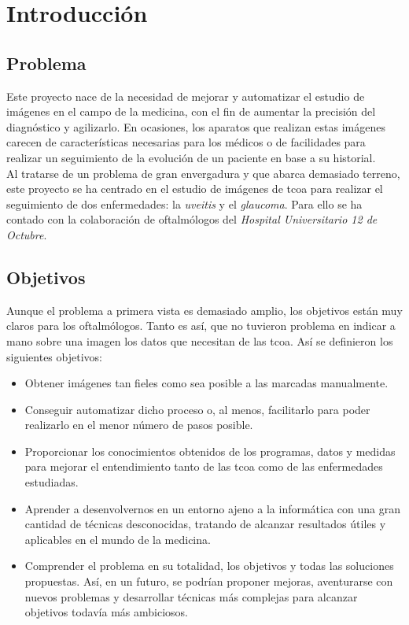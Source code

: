 \chapter{Introducción}
\section{Problema}
Este proyecto nace de la necesidad de mejorar y automatizar el estudio 
de imágenes en el campo de la medicina, con el fin de aumentar la precisión 
del diagnóstico y agilizarlo. En ocasiones, los aparatos que realizan 
estas imágenes carecen de características necesarias para los médicos 
o de facilidades para realizar un seguimiento de la evolución de un paciente 
en base a su historial. \\
Al tratarse de un problema de gran envergadura y que abarca demasiado
terreno, este proyecto se ha centrado en el estudio de imágenes de \gls{tcoa}
para realizar el seguimiento de dos enfermedades: la \emph{uveitis} y
el \emph{glaucoma}. Para ello se ha contado con la colaboración de
oftalmólogos del \emph{Hospital Universitario 12 de Octubre}.

\section{Objetivos}
Aunque el problema a primera vista es demasiado amplio,
los objetivos están muy claros para los oftalmólogos. Tanto es así, 
que no tuvieron problema en indicar a mano sobre una imagen los datos que 
necesitan de las \gls{tcoa}. Así se definieron los siguientes objetivos:
\begin{itemize}
\item Obtener imágenes tan fieles como sea posible a las marcadas
  manualmente.
\item Conseguir automatizar dicho proceso o, al menos,
  facilitarlo para poder realizarlo en el menor número de pasos posible.
\item Proporcionar los conocimientos obtenidos de los programas, datos y
  medidas para mejorar el entendimiento tanto de las \gls{tcoa}
  como de las enfermedades estudiadas.
\item Aprender a desenvolvernos en un entorno ajeno a la informática
  con una gran cantidad de técnicas desconocidas, tratando 
  de alcanzar resultados útiles y aplicables en el mundo de la medicina.
\item Comprender el problema en su totalidad, los objetivos y todas
  las soluciones propuestas. Así, en un futuro, se podrían proponer mejoras,
  aventurarse con nuevos problemas y desarrollar técnicas más complejas
  para alcanzar objetivos todavía más ambiciosos.
\end{itemize}
